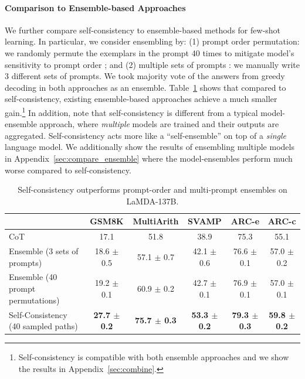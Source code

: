 \documentclass{article} %
\begin{document}
\paragraph{Comparison to Ensemble-based Approaches}
We further compare self-consistency to ensemble-based methods for few-shot learning. 
In particular, we consider ensembling by:
(1) prompt order permutation: we randomly permute the exemplars in the prompt 40 times to mitigate model's sensitivity to prompt order \citep{pmlr-v139-zhao21c,Lu2021FantasticallyOP};
and (2) multiple sets of prompts \citep{gao-etal-2021-making}: we manually write $3$ different sets of prompts.
We took majority vote of the answers from greedy decoding in both approaches as an ensemble.
Table~\ref{tab:ensemble} shows that compared to self-consistency, existing ensemble-based approaches achieve a much smaller gain.\footnote{Self-consistency is compatible with both ensemble approaches and we show the results in Appendix~\ref{sec:combine}.}
In addition, note that self-consistency is different from a typical model-ensemble approach, where \textit{multiple} models are trained and their outputs are aggregated. Self-consistency acts more like a ``self-ensemble'' on top of a \textit{single} language model. We additionally show the results of ensembling multiple models in Appendix~\ref{sec:compare_ensemble} where the model-ensembles perform much worse compared to self-consistency.

\begin{table}[h]
\small
    \centering
    \vspace{-0.1in}
    \begin{tabular}{l ccccc}
        \toprule
        & GSM8K & MultiArith & SVAMP & ARC-e &  ARC-c\\
        \midrule
        CoT \citep{wei2022chain} & 17.1 &  51.8 & 38.9 & 75.3 & 55.1 \\
        Ensemble (3 sets of prompts) & 18.6 \scriptsize{$\pm$ 0.5} & 57.1 \scriptsize{$\pm$ 0.7} & 42.1 \scriptsize{$\pm$ 0.6} & 76.6 \scriptsize{$\pm$ 0.1} & 57.0 \scriptsize{$\pm$ 0.2} \\
        Ensemble (40 prompt permutations) & 19.2 \scriptsize{$\pm$ 0.1} & 60.9 \scriptsize{$\pm$ 0.2} & 42.7 \scriptsize{$\pm$ 0.1} & 76.9 \scriptsize{$\pm$ 0.1} & 57.0 \scriptsize{$\pm$ 0.1} \\
        Self-Consistency (40 sampled paths) & \textbf{27.7 \scriptsize{$\pm$ 0.2}} & \textbf{75.7 \scriptsize{$\pm$ 0.3}} & \textbf{53.3 \scriptsize{$\pm$ 0.2}} & \textbf{79.3 \scriptsize{$\pm$ 0.3}} & \textbf{59.8 \scriptsize{$\pm$ 0.2}}\\
    \bottomrule
    \end{tabular}
    \vspace{-0.1in}
    \caption{Self-consistency outperforms prompt-order and multi-prompt ensembles on LaMDA-137B.}
    \label{tab:ensemble}
\vspace{-0.15in}
\end{table}
\end{document}
